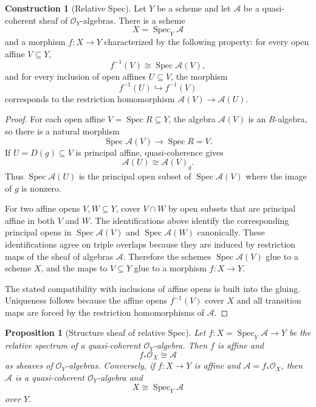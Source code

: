 \documentclass[11pt]{amsart}
\DeclareMathOperator{\Spec}{Spec}
\newcommand{\OO}{\mathcal O}
\newcommand{\A}{\mathscr A}
\newcommand{\into}{\hookrightarrow}
\theoremstyle{plain}
\newtheorem{proposition}[theorem]{Proposition}
\theoremstyle{definition}
\newtheorem{construction}[theorem]{Construction}
\theoremstyle{remark}
\begin{document}
\begin{construction}[Relative Spec]\label{cons:relative-spec}
Let $Y$ be a scheme and let $\A$ be a quasi-coherent sheaf of $\OO_Y$-algebras.  There is a scheme
\[
  X=\Spec_Y\A
\]
and a morphism $f:X\to Y$ characterized by the following property: for every open affine $V\subseteq Y$,
\[
  f^{-1}(V)\cong \Spec \A(V),
\]
and for every inclusion of open affines $U\subseteq V$, the morphism
\[
  f^{-1}(U)\into f^{-1}(V)
\]
corresponds to the restriction homomorphism $\A(V)\to \A(U)$.
\end{construction}

\begin{proof}
For each open affine $V=\Spec R\subseteq Y$, the algebra $\A(V)$ is an $R$-algebra, so there is a natural morphism
\[
  \Spec\A(V)\longrightarrow \Spec R=V.
\]
If $U=D(g)\subseteq V$ is principal affine, quasi-coherence gives
\[
  \A(U)\cong \A(V)_g.
\]
Thus $\Spec\A(U)$ is the principal open subset of $\Spec\A(V)$ where the image of $g$ is nonzero.

For two affine opens $V,W\subseteq Y$, cover $V\cap W$ by open subsets that are principal affine in both $V$ and $W$.  The identifications above identify the corresponding principal opens in $\Spec\A(V)$ and $\Spec\A(W)$ canonically.  These identifications agree on triple overlaps because they are induced by restriction maps of the sheaf of algebras $\A$.  Therefore the schemes $\Spec\A(V)$ glue to a scheme $X$, and the maps to $V\subseteq Y$ glue to a morphism $f:X\to Y$.

The stated compatibility with inclusions of affine opens is built into the gluing.  Uniqueness follows because the affine opens $f^{-1}(V)$ cover $X$ and all transition maps are forced by the restriction homomorphisms of $\A$.
\end{proof}

\begin{proposition}[Structure sheaf of relative Spec]\label{prop:relative-spec-structure}
Let $f:X=\Spec_Y\A\to Y$ be the relative spectrum of a quasi-coherent $\OO_Y$-algebra.  Then $f$ is affine and
\[
  f_*\OO_X\cong \A
\]
as sheaves of $\OO_Y$-algebras.  Conversely, if $f:X\to Y$ is affine and $\A=f_*\OO_X$, then $\A$ is a quasi-coherent $\OO_Y$-algebra and
\[
  X\cong \Spec_Y\A
\]
over $Y$.
\end{proposition}
\end{document}
